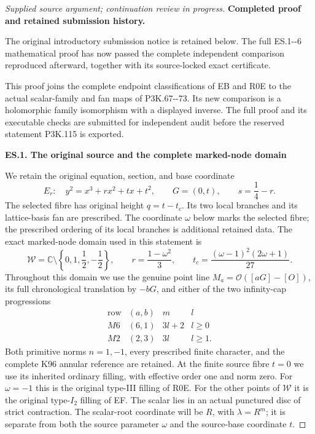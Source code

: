 \begin{proof}[Supplied source argument; continuation review in progress]

\par

\medskip\noindent\textbf{Completed proof and retained submission history.}

\par

The original introductory submission notice is retained below. The full ES.1-\/-6 mathematical proof has now passed the complete independent comparison reproduced afterward, together with its source-locked exact certificate.

This proof joins the complete endpoint classifications of EB and R0E to
the actual scalar-family and fan maps of P3K.67-\/-73. Its new comparison
is a holomorphic family isomorphism with a displayed inverse. The
full proof and its executable checks are submitted for independent
audit before the reserved statement P3K.115 is exported.

\par

\medskip\noindent\textbf{ES.1. The original source and the complete marked-node domain}

\par\nobreak

We retain the original equation, section, and base coordinate
\[
 E_r:\quad y^2=x^3+rx^2+tx+t^2,\qquad G=(0,t),\qquad
 s=\frac14-r .
 \tag{ES.1}
\]
The selected fibre has original height \(q=t-t_c\). Its two local
branches and its lattice-basis fan are prescribed. The coordinate
\(\omega\) below marks the selected fibre; the prescribed ordering
of its local branches is additional retained data. The exact
marked-node domain used in this statement is
\[
 \mathcal W=\mathbb C\setminus
 \left\{0,1,\frac12,-\frac12\right\},\qquad
 r=\frac{1-\omega^2}{3},\qquad
 t_c=\frac{(\omega-1)^2(2\omega+1)}{27}.
 \tag{ES.2}
\]
Throughout this domain we use the genuine point line
\(M_a=\mathcal O([aG]-[O])\), its full chronological translation
by \(-bG\), and either of the two infinity-cap progressions
\[
 \begin{array}{c|c|c|c}
 \text{row}&(a,b)&m&l\\ \hline
 M6&(6,1)&3l+2&l\geq0\\
 M2&(2,3)&3l&l\geq1 .
 \end{array}
 \tag{ES.3}
\]
Both primitive norms \(n=1,-1\), every prescribed finite character,
and the complete K96 annular reference are retained. At the finite
source fibre \(t=0\) we use its inherited ordinary filling, with
effective order one and norm zero. For \(\omega=-1\) this is the
original type-III filling of R0E. For the other points of
\(\mathcal W\) it is the original type-\(I_2\) filling of EF.
The scalar lies in an actual punctured disc of strict contraction.
The scalar-root coordinate will be \(R\), with \(\lambda=R^m\);
it is separate from both the source parameter \(\omega\) and the
source-base coordinate \(t\).


\end{proof}
